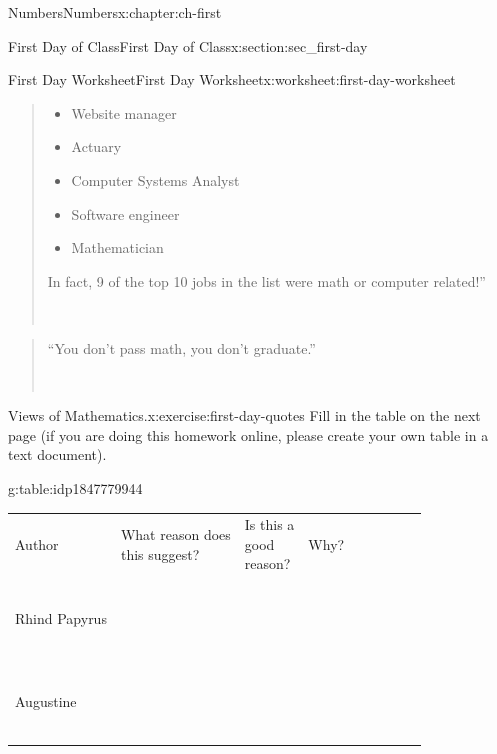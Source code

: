 \documentclass[twoside,10pt,]{book}
\makeatletter
\newcommand{\tabularfont}{\relax}
\numberwithin{equation}{chapter}
\newcommand{\hrulethin}  {\noalign{\hrule height 0.04em}}
\newcommand{\hrulemedium}{\noalign{\hrule height 0.07em}}
\newcommand{\tablecelllines}[3]%
{\begin{tabular}[#2]{@{}#1@{}}#3\end{tabular}}
\makeatother
\begin{document}
\begin{chapterptx}{Numbers}{}{Numbers}{}{}{x:chapter:ch-first}
\begin{sectionptx}{First Day of Class}{}{First Day of Class}{}{}{x:section:sec_first-day}
\begin{worksheet-subsection}{First Day Worksheet}{}{First Day Worksheet}{}{}{x:worksheet:first-day-worksheet}
\begin{quote}
\begin{itemize}[label=\textbullet]
\item{}Website manager%
\item{}Actuary%
\item{}Computer Systems Analyst%
\item{}Software engineer%
\item{}Mathematician%
\end{itemize}
 In fact, 9 of the top 10 jobs in the list were math or computer related!''%
\nopagebreak\par%
\hfill{}\\\par
\end{quote}
\begin{quote}%
``You don't pass math, you don't graduate.''%
\nopagebreak\par%
\hfill{}\\\par
\end{quote}
\begin{divisionexercise}{2}{Views of Mathematics.}{}{x:exercise:first-day-quotes}%
Fill in the table on the next page (if you are doing this homework online, please create your own table in a text document).\end{divisionexercise}%
\clearpage
\begin{tableptx}{\textbf{}}{g:table:idp1847779944}{}%
\centering%
{\tabularfont%
\begin{tabular}{AlAlAlAlA}\hrulethin
Author&\tablecelllines{l}{m}
{What reason does\\
this suggest?}
&\tablecelllines{l}{m}
{Is this a\\
good\\
reason?}
&Why?\tabularnewline\hrulemedium
Rhind Papyrus&&&\tablecelllines{l}{m}
{\\
\\
\\
\\
}
\tabularnewline\hrulethin
Augustine&&&\tablecelllines{l}{m}
{\\
\\
\\
\\
}
\end{tabular}}
\end{tableptx}
\end{worksheet-subsection}
\end{sectionptx}
\end{chapterptx}
\end{document}
